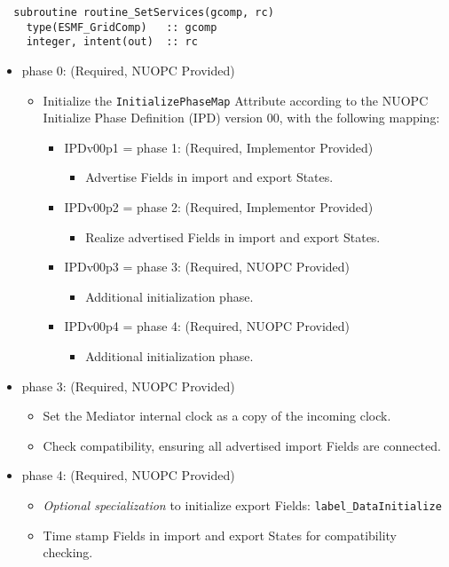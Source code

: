 \begin{verbatim}  subroutine routine_SetServices(gcomp, rc)
    type(ESMF_GridComp)   :: gcomp
    integer, intent(out)  :: rc
\end{verbatim}

\begin{itemize}
\item phase 0: ({\sc Required, NUOPC Provided})
  \begin{itemize}
  \item Initialize the {\tt InitializePhaseMap} Attribute according to the NUOPC Initialize Phase Definition (IPD) version 00, with the following mapping:
    \begin{itemize}
    \item IPDv00p1 = phase 1: ({\sc Required, Implementor Provided})
      \begin{itemize}
      \item Advertise Fields in import and export States.
      \end{itemize}
    \item IPDv00p2 = phase 2: ({\sc Required, Implementor Provided})
      \begin{itemize}
      \item Realize advertised Fields in import and export States.
      \end{itemize}  
    \item IPDv00p3 = phase 3: ({\sc Required, NUOPC Provided})
      \begin{itemize}
      \item Additional initialization phase.
      \end{itemize}
    \item IPDv00p4 = phase 4: ({\sc Required, NUOPC Provided})
      \begin{itemize}
      \item Additional initialization phase.
      \end{itemize}
    \end{itemize}  
  \end{itemize}  
\item phase 3: ({\sc Required, NUOPC Provided})
  \begin{itemize}
  \item Set the Mediator internal clock as a copy of the incoming clock. 
  \item Check compatibility, ensuring all advertised import Fields are connected.
  \end{itemize}  
\item phase 4: ({\sc Required, NUOPC Provided})
  \begin{itemize}
  \item {\it Optional specialization} to initialize export Fields: {\tt label\_DataInitialize}
  \item Time stamp Fields in import and export States for compatibility checking.
  \end{itemize}    
\end{itemize}


